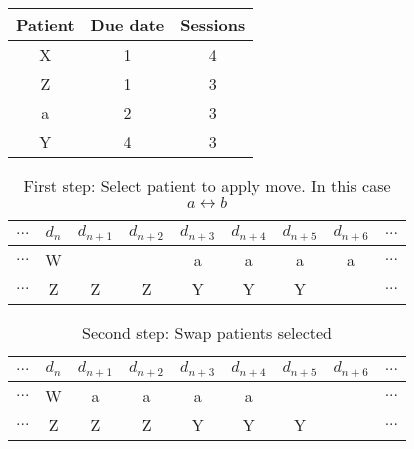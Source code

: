 \begin{table}
\centering
\begin{tabular}{|c|c|c|}
	\hline
	Patient & Due date & Sessions\\
	\hline
	X & 1 & 4\\
	\hline
	Z & 1 & 3\\
	\hline
	a & 2 & 3\\
	\hline
	Y & 4 & 3\\
	\hline
\end{tabular}
\end{table}



\begin{table}
\centering
\begin{tabular}{|c|c|c|c|c|c|c|c|c|}
	\multicolumn{1}{c}{$...$} & \multicolumn{1}{c}{$d_n$} & \multicolumn{1}{c}{$d_{n+1}$} & \multicolumn{1}{c}{$d_{n+2}$} & \multicolumn{1}{c}{$d_{n+3}$} & \multicolumn{1}{c}{$d_{n+4}$} & \multicolumn{1}{c}{$d_{n+5}$} & \multicolumn{1}{c}{$d_{n+6}$} & \multicolumn{1}{c}{$...$}\\
	\hline
	$...$ & W &   &   & a & a & a & a & $...$\\
	\hline
	$...$ & Z & Z & Z & Y & Y & Y &   & $...$\\
	\hline
\end{tabular}
\caption{First step: Select patient to apply move. In this case $a\leftrightarrow b$}
\end{table}

\begin{table}
\centering
\begin{tabular}{|c|c|c|c|c|c|c|c|c|}
	\multicolumn{1}{c}{$...$} & \multicolumn{1}{c}{$d_n$} & \multicolumn{1}{c}{$d_{n+1}$} & \multicolumn{1}{c}{$d_{n+2}$} & \multicolumn{1}{c}{$d_{n+3}$} & \multicolumn{1}{c}{$d_{n+4}$} & \multicolumn{1}{c}{$d_{n+5}$} & \multicolumn{1}{c}{$d_{n+6}$} & \multicolumn{1}{c}{$...$}\\
	\hline
	$...$ & W & a & a & a & a &   &   & $...$\\
	\hline
	$...$ & Z & Z & Z & Y & Y & Y &   & $...$\\
	\hline
\end{tabular}
\caption{Second step: Swap patients selected}
\end{table}